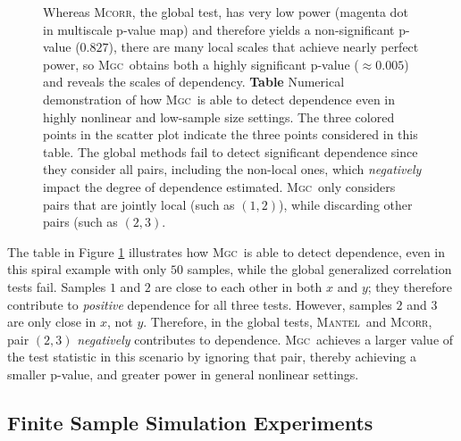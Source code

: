 \documentclass[11pt]{article}
\providecommand{\sct}[1]{{\normalfont\textsc{#1}}}
\newcommand{\Mgc}{\sct{Mgc}}
\newcommand{\Mcorr}{\sct{Mcorr}}
\newcommand{\Mantel}{\sct{Mantel}}
\begin{document}
\begin{figure}[htbp]
{%
Whereas \Mcorr, the global test, has very low power (magenta dot in multiscale p-value map) and therefore yields a non-significant p-value ($0.827$),  there are many local scales that achieve nearly perfect power, so \Mgc~obtains both a highly significant p-value ($\approx 0.005$) and reveals the scales of dependency. \textbf{Table} Numerical demonstration of how \Mgc~is able to detect dependence even in highly nonlinear and low-sample size settings. The three colored points in the scatter plot indicate the three points considered in this table. 
The global methods fail to detect significant dependence since they consider all pairs, including the non-local ones, which \emph{negatively} impact the degree of dependence estimated.
\Mgc~only considers pairs that are jointly local (such as $(1,2)$), while discarding other pairs (such as $(2,3)$. 
}
\label{f:schematic}
\end{figure}


The table in Figure \ref{f:schematic}  illustrates how \Mgc~is able to detect dependence, even in this spiral example with only $50$ samples, while the global generalized correlation tests fail.  Samples $1$ and $2$ are close to each other in both $x$ and $y$; they therefore contribute to \emph{positive} dependence for all three tests.  However, samples $2$ and $3$ are only close in $x$, not $y$.  Therefore, in the global tests, \Mantel~and \Mcorr, pair $(2,3)$   \emph{negatively} contributes to dependence.  \Mgc~achieves a larger value of the test statistic in this scenario by ignoring that pair, thereby achieving a smaller p-value, and greater power in general nonlinear settings.  





\subsection*{Finite Sample Simulation Experiments}
\end{document}
